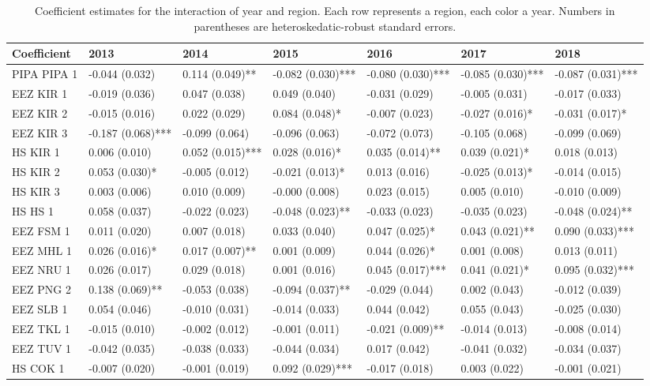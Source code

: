 \begin{table}

\caption{\label{tab:}\label{tab:mean_change}Coefficient estimates for the interaction of year and region. Each row represents a region, each color a year. Numbers in parentheses are heteroskedatic-robust standard errors.}
\centering
\begin{tabular}[t]{lllllll}
\toprule
Coefficient & 2013 & 2014 & 2015 & 2016 & 2017 & 2018\\
\midrule
PIPA PIPA 1 & -0.044 (0.032) & 0.114 (0.049)** & -0.082 (0.030)*** & -0.080 (0.030)*** & -0.085 (0.030)*** & -0.087 (0.031)***\\
EEZ KIR 1 & -0.019 (0.036) & 0.047 (0.038) & 0.049 (0.040) & -0.031 (0.029) & -0.005 (0.031) & -0.017 (0.033)\\
EEZ KIR 2 & -0.015 (0.016) & 0.022 (0.029) & 0.084 (0.048)* & -0.007 (0.023) & -0.027 (0.016)* & -0.031 (0.017)*\\
EEZ KIR 3 & -0.187 (0.068)*** & -0.099 (0.064) & -0.096 (0.063) & -0.072 (0.073) & -0.105 (0.068) & -0.099 (0.069)\\
HS KIR 1 & 0.006 (0.010) & 0.052 (0.015)*** & 0.028 (0.016)* & 0.035 (0.014)** & 0.039 (0.021)* & 0.018 (0.013)\\
\addlinespace
HS KIR 2 & 0.053 (0.030)* & -0.005 (0.012) & -0.021 (0.013)* & 0.013 (0.016) & -0.025 (0.013)* & -0.014 (0.015)\\
HS KIR 3 & 0.003 (0.006) & 0.010 (0.009) & -0.000 (0.008) & 0.023 (0.015) & 0.005 (0.010) & -0.010 (0.009)\\
HS HS 1 & 0.058 (0.037) & -0.022 (0.023) & -0.048 (0.023)** & -0.033 (0.023) & -0.035 (0.023) & -0.048 (0.024)**\\
EEZ FSM 1 & 0.011 (0.020) & 0.007 (0.018) & 0.033 (0.040) & 0.047 (0.025)* & 0.043 (0.021)** & 0.090 (0.033)***\\
EEZ MHL 1 & 0.026 (0.016)* & 0.017 (0.007)** & 0.001 (0.009) & 0.044 (0.026)* & 0.001 (0.008) & 0.013 (0.011)\\
\addlinespace
EEZ NRU 1 & 0.026 (0.017) & 0.029 (0.018) & 0.001 (0.016) & 0.045 (0.017)*** & 0.041 (0.021)* & 0.095 (0.032)***\\
EEZ PNG 2 & 0.138 (0.069)** & -0.053 (0.038) & -0.094 (0.037)** & -0.029 (0.044) & 0.002 (0.043) & -0.012 (0.039)\\
EEZ SLB 1 & 0.054 (0.046) & -0.010 (0.031) & -0.014 (0.033) & 0.044 (0.042) & 0.055 (0.043) & -0.025 (0.030)\\
EEZ TKL 1 & -0.015 (0.010) & -0.002 (0.012) & -0.001 (0.011) & -0.021 (0.009)** & -0.014 (0.013) & -0.008 (0.014)\\
EEZ TUV 1 & -0.042 (0.035) & -0.038 (0.033) & -0.044 (0.034) & 0.017 (0.042) & -0.041 (0.032) & -0.034 (0.037)\\
HS COK 1 & -0.007 (0.020) & -0.001 (0.019) & 0.092 (0.029)*** & -0.017 (0.018) & 0.003 (0.022) & -0.001 (0.021)\\
\bottomrule
\end{tabular}
\end{table}
